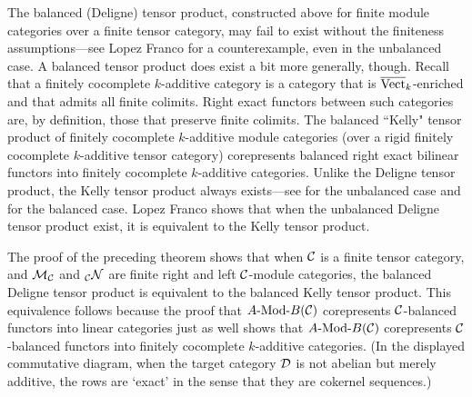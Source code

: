 \documentclass{amsart}
\begin{document}
\begin{remark}
The balanced (Deligne) tensor product, constructed above for finite module categories over a finite tensor category, may fail to exist without the finiteness assumptions---see Lopez Franco \cite{1212.1545} for a counterexample, even in the unbalanced case.  A balanced tensor product does exist a bit more generally, though.  Recall that a finitely cocomplete $k$-additive category is a category that is $\overline{\mathrm{Vect}}_k$-enriched and that admits all finite colimits.  Right exact functors between such categories are, by definition, those that preserve finite colimits.  The balanced ``Kelly" tensor product of finitely cocomplete $k$-additive module categories (over a rigid finitely cocomplete $k$-additive tensor category) corepresents balanced right exact bilinear functors into finitely cocomplete $k$-additive categories.  Unlike the Deligne tensor product, the Kelly tensor product always exists---see \cite{MR651714, MR648793} for the unbalanced case and \cite[Rmk~3.21]{1501.04652} for the balanced case.  Lopez Franco \cite{1212.1545} shows that when the unbalanced Deligne tensor product exist, it is equivalent to the Kelly tensor product.

The proof of the preceding theorem shows that when $\mathcal C$ is a finite tensor category, and $\mathcal M_{\mathcal C}$ and ${}_{\mathcal C}\mathcal N$ are finite right and left $\mathcal C$-module categories, the balanced Deligne tensor product is equivalent to the balanced Kelly tensor product.  This equivalence follows because the proof that $\Mod{A}{B}(\cC)$ corepresents $\mathcal C$-balanced functors into linear categories just as well shows that $\Mod{A}{B}(\cC)$ corepresents $\mathcal C$-balanced functors into finitely cocomplete $k$-additive categories.  (In the displayed commutative diagram, when the target category $\mathcal D$ is not abelian but merely additive, the rows are `exact' in the sense that they are cokernel sequences.)
\end{remark}
\end{document}
